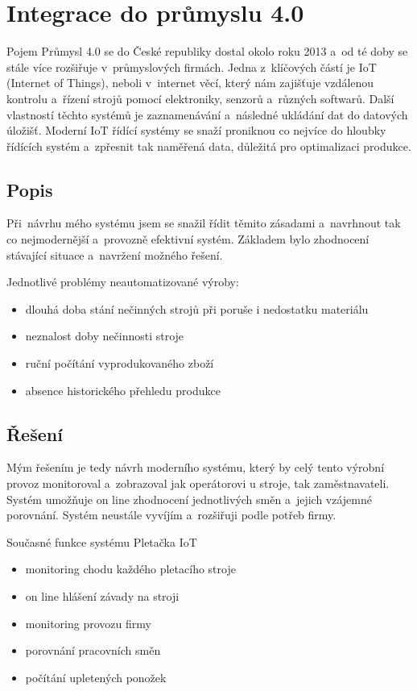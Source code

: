 \chapter{Integrace do průmyslu 4.0}
Pojem Průmysl 4.0 se do České republiky dostal okolo roku 2013 a~od té doby se stále více rozšiřuje v~průmyslových firmách.
Jedna z~klíčových částí je IoT (Internet of Things), neboli v~internet věcí, který nám zajišťuje vzdálenou kontrolu a~řízení strojů pomocí elektroniky, senzorů a~různých softwarů.
Další vlastností těchto systémů je zaznamenávání a~následné ukládání dat do datových úložišť.
Moderní IoT řídící systémy se snaží proniknou co nejvíce do hloubky řídících systém a~zpřesnit tak naměřená data, důležitá pro optimalizaci produkce.   

\section{Popis}
Při~návrhu mého systému jsem se snažil řídit těmito zásadami a~navrhnout tak co nejmodernější a~provozně efektivní systém.
Základem bylo zhodnocení stávající situace a~navržení možného řešení.

Jednotlivé problémy neautomatizované výroby:
\begin{itemize}
    \item dlouhá doba stání nečinných strojů při poruše i nedostatku materiálu
    \item neznalost doby nečinnosti stroje
    \item ruční počítání vyprodukovaného zboží
    \item absence historického přehledu produkce
\end{itemize}

\section{Řešení}
Mým řešením je tedy návrh moderního systému, který by celý tento výrobní provoz monitoroval a~zobrazoval jak operátorovi u stroje, tak zaměstnavateli.
Systém umožňuje on line zhodnocení jednotlivých směn a~jejich vzájemné porovnání.
Systém neustále vyvíjím a~rozšiřuji podle potřeb firmy.

Současné funkce systému Pletačka IoT
\begin{itemize}
    \item monitoring chodu každého pletacího stroje
    \item on line hlášení závady na stroji
    \item monitoring provozu firmy
    \item porovnání pracovních směn
    \item počítání upletených ponožek
\end{itemize}



